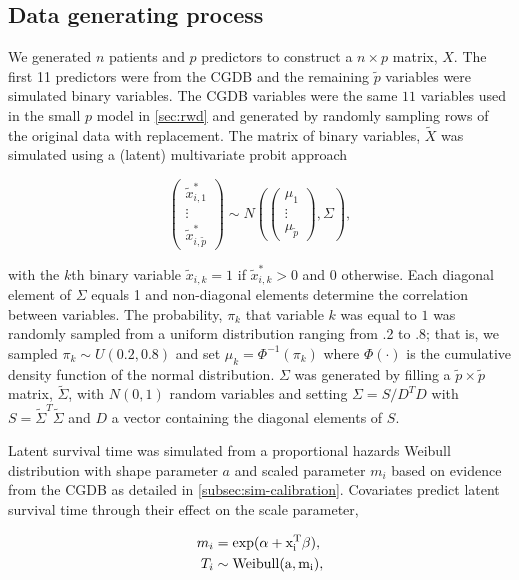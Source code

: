 \documentclass[11pt,final,fleqn]{article}\usepackage[]{graphicx}\usepackage[]{color}
\theoremstyle{plain}
\begin{document}
\subsection{Data generating process}
We generated $n$ patients and $p$ predictors to construct a $n \times p$ matrix, $X$. The first 11 predictors were from the CGDB and the remaining $\tilde{p}$ variables were simulated binary variables. The CGDB variables were the same $11$ variables used in the small $p$ model in \autoref{sec:rwd} and generated by randomly sampling rows of the original data with replacement. The matrix of binary variables, $\tilde{X}$ was simulated using a (latent) multivariate probit approach

\begin{equation}
\begin{pmatrix}
\tilde{x}_{i,1}^{*} \\
\vdots \\
\tilde{x}_{i,\tilde{p}}^{*}
\end{pmatrix}
\sim
N
\left(\begin{pmatrix}
\mu_{1} \\
\vdots \\
\mu_{\tilde{p}}
\end{pmatrix},
\Sigma
\right),
\end{equation}

with the $k$th binary variable $\tilde{x}_{i,k}=1$ if $\tilde{x}_{i,k}^{*} > 0$ and $0$ otherwise. Each diagonal element of $\Sigma$ equals 1 and non-diagonal elements determine the correlation between variables. The probability, $\pi_k$ that  variable $k$ was equal to $1$ was randomly sampled from a uniform distribution ranging from .2 to .8; that is, we sampled $\pi_k \sim U(0.2, 0.8)$ and set $\mu_k = \Phi^{-1}(\pi_k)$ where $\Phi(\cdot)$ is the cumulative density function of the normal distribution. $\Sigma$ was generated by filling a $\tilde{p} \times \tilde{p}$ matrix, $\tilde{\Sigma}$, with $N(0,1)$ random variables and setting  $\Sigma = S/D^TD$ with $S = \tilde{\Sigma}^T\tilde{\Sigma}$ and $D$ a vector containing the diagonal elements of $S$. 

Latent survival time was simulated from a proportional hazards Weibull distribution with shape parameter $a$ and scaled parameter $m_i$ based on evidence from the CGDB as detailed in \autoref{subsec:sim-calibration}. Covariates predict latent survival time through their effect on the scale parameter,

\begin{align} 
m_i &= \rm{exp}(\alpha + x_i^T\beta), \\
T_i &\sim \rm{Weibull}(a, m_i),
\end{align} 
\end{document}
